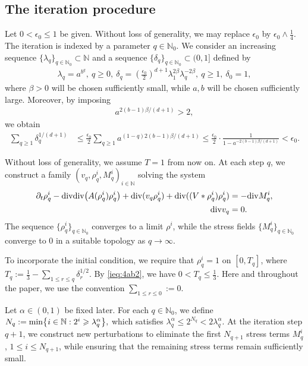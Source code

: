 \documentclass[UTF-8,reqno]{amsart}
\numberwithin{equation}{section}
\theoremstyle{definition}
\def\min{{\mathord{{\rm min}}}}
\def\geq{\geqslant}
\def\leq{\leqslant}
\def\div{\mathord{{\rm div}}}
\def\min{{\mathord{{\rm min}}}}
\def\geq{\geqslant}
\def\leq{\leqslant}
\def\div{\mathord{{\rm div}}}
\begin{document}
\subsection{The iteration procedure}
Let $0<\epsilon_0\leq 1$ be given. Without loss of generality, we may replace $\epsilon_0$ by
$
\epsilon_0\wedge \frac14.
$ The iteration is indexed by a parameter
$
q\in\mathbb{N}_0.
$
We consider an increasing sequence
$
\{\lambda_q\}_{q\in\mathbb{N}_0}\subset\mathbb{N}
$
and a sequence
$
\{\delta_q\}_{q\in\mathbb{N}_0}\subset(0,1]
$
defined by
\begin{align*}
\lambda_q
=
a^{b^q},
\ 
q\geq0,
\ 
\delta_q
=
(\frac{\epsilon_0}{2})^{d+1}
\lambda_1^{2\beta}
\lambda_q^{-2\beta},
\ 
q\geq1,
\ 
\delta_0=1,
\end{align*}
where $\beta>0$ will be chosen sufficiently small, while $a,b$ will be chosen sufficiently large.
Moreover, by imposing
\begin{align}
a^{2(b-1)\beta/(d+1)}>2,
\label{ieq:4ab2}
\end{align}
we obtain
\begin{align*}
\sum_{q\geq1}\delta_q^{1/(d+1)}
&\leq
\frac{\epsilon_0}{2}
\sum_{q\geq1}
a^{(1-q)2(b-1)\beta/(d+1)}
\leq
\frac{\epsilon_0}{2}
\cdot
\frac1{1-a^{-2(b-1)\beta/(d+1)}}
<
\epsilon_0.
\end{align*} 
 

Without loss of generality, we assume $T=1$ from now on. 
At each step $q$, we construct a family
$(v_q,\rho_q^i,M_q^i)_{i\in\mathbb{N}}$
solving the system
\begin{align}\label{eq:4qth}
\partial_t\rho_q^i
-
\div\div\bigl(A(\rho_q^i)\rho_q^i\bigr)
+
\div(v_q\rho_q^i)+\div((V*\rho_q^i)\rho_q^i)
&=
-\div M_q^i,
\\
\div v_q&=0.
\notag
\end{align}
The sequence $\{\rho_q^i\}_{q\in\mathbb{N}_0}$ converges to a limit $\rho^i$, while the stress fields $\{M_q^i\}_{q\in\mathbb{N}_0}$ converge to $0$ in a suitable topology as $q\to\infty$.

To incorporate the initial condition, we require that
$\rho_q^i=1$ on $[0,T_q]$, where
$
T_q:=\frac13-\sum_{1\leq r\leq q}\delta_r^{1/2}.
$
By \eqref{ieq:4ab2}, we have
$
0<T_q\leq \frac13.
$
Here and throughout the paper, we use the convention
$
\sum_{1\leq r\leq0}:=0.
$

Let $\alpha\in(0,1)$ be fixed later. 
For each $q\in\mathbb{N}_0$, we define
$
N_q:=\min\bigl\{i\in\mathbb{N}:2^i\geq\lambda_q^\alpha\bigr\},
$
which satisfies
$
\lambda_q^\alpha
\leq
2^{N_q}<2\lambda_q^\alpha.$
At the iteration step $q+1$, we construct new perturbations to eliminate the first $N_{q+1}$ stress terms
$M_q^i$, $1\leq i\leq N_{q+1}$,
while ensuring that the remaining stress terms remain sufficiently small.
\end{document}
